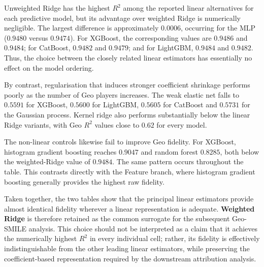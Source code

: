 Unweighted Ridge has the highest $R^2$ among the reported linear alternatives for each predictive model, but its advantage over weighted Ridge is numerically negligible. The largest difference is approximately $0.0006$, occurring for the MLP ($0.9480$ versus $0.9474$). For XGBoost, the corresponding values are $0.9486$ and $0.9484$; for CatBoost, $0.9482$ and $0.9479$; and for LightGBM, $0.9484$ and $0.9482$. Thus, the choice between the closely related linear estimators has essentially no effect on the model ordering.

By contrast, regularisation that induces stronger coefficient shrinkage performs poorly as the number of Geo players increases. The weak elastic net falls to $0.5591$ for XGBoost, $0.5600$ for LightGBM, $0.5605$ for CatBoost and $0.5731$ for the Gaussian process. Kernel ridge also performs substantially below the linear Ridge variants, with Geo $R^2$ values close to $0.62$ for every model.

The non-linear controls likewise fail to improve Geo fidelity. For XGBoost, histogram gradient boosting reaches $0.9047$ and random forest $0.8285$, both below the weighted-Ridge value of $0.9484$. The same pattern occurs throughout the table. This contrasts directly with the Feature branch, where histogram gradient boosting generally provides the highest raw fidelity.

Taken together, the two tables show that the principal linear estimators provide almost identical fidelity wherever a linear representation is adequate. \textbf{Weighted Ridge} is therefore retained as the common surrogate for the subsequent Geo-SMILE analysis. This choice should not be interpreted as a claim that it achieves the numerically highest $R^2$ in every individual cell; rather, its fidelity is effectively indistinguishable from the other leading linear estimators, while preserving the coefficient-based representation required by the downstream attribution analysis.

